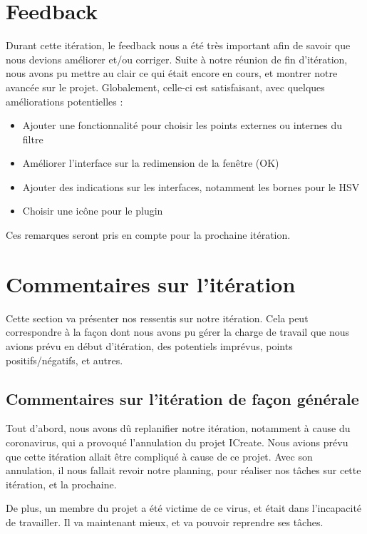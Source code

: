 \documentclass[12pt,titlepage,french]{article}
\begin{document}
\section{Feedback}

Durant cette itération, le feedback nous a été très important afin de savoir que nous devions améliorer et/ou corriger. Suite à notre réunion de fin d'itération, nous avons pu mettre au clair ce qui était encore en cours, et montrer notre avancée sur le projet. Globalement, celle-ci est satisfaisant, avec quelques améliorations potentielles :

\begin{itemize}
    \item Ajouter une fonctionnalité pour choisir les points externes ou internes du filtre
    \item Améliorer l'interface sur la redimension de la fenêtre (OK)
    \item Ajouter des indications sur les interfaces, notamment les bornes pour le HSV
    \item Choisir une icône pour le plugin
\end{itemize}

Ces remarques seront pris en compte pour la prochaine itération.

\section{Commentaires sur l'itération}

Cette section va présenter nos ressentis sur notre itération. Cela peut correspondre à la façon dont nous avons pu gérer la charge de travail que nous avions prévu en début d'itération, des potentiels imprévus, points positifs/négatifs, et autres.

\subsection{Commentaires sur l'itération de façon générale}

Tout d'abord, nous avons dû replanifier notre itération, notamment à cause du coronavirus, qui a provoqué l'annulation du projet ICreate. Nous avions prévu que cette itération allait être compliqué à cause de ce projet. Avec son annulation, il nous fallait revoir notre planning, pour réaliser nos tâches sur cette itération, et la prochaine. \newline

De plus, un membre du projet a été victime de ce virus, et était dans l'incapacité de travailler. Il va maintenant mieux, et va pouvoir reprendre ses tâches. \newline
\end{document}

